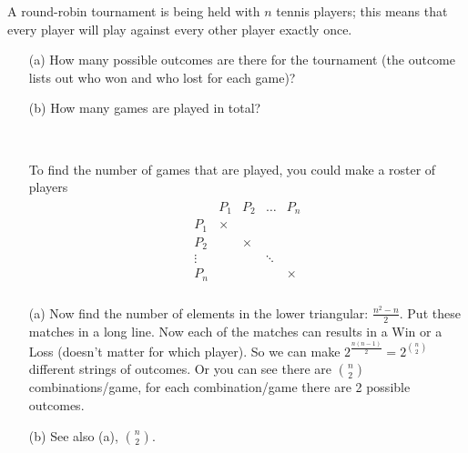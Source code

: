 

\setcounter{theorem}{3}
\begin{exercise}[BH.1.4]
	A round-robin tournament is being held with $n$ tennis players; this means that every player will play against every other player exactly once.
	\begin{enumerate}
		\item[(a)] How many possible outcomes are there for the tournament (the outcome lists out who won and who lost for each game)?
		\item[(b)] How many games are played in total?
	\end{enumerate}
\begin{solution}~
	\begin{enumerate}
		\item[] To find the number of games that are played, you could make a roster of players
		\begin{align*}
			\begin{array}{ccccc}
				&P_{1} & P_{2} &\ldots &P_{n}\\
				P_{1} & \times \\
				P_{2} & & \times \\
				\vdots&&&\ddots\\
				P_{n} & & & &\times\\
				\end{array}
		\end{align*}
		\item[(a)] Now find the number of elements in the lower triangular: $\frac{n^2-n}{2}$. Put these matches in a long line. Now each of the matches can results in a Win or a Loss (doesn't matter for which player). So we can make $2^{\frac{n(n-1)}{2}}=2^{n\choose 2 }$ different strings of outcomes. Or you can see there are $n\choose 2$ combinations/game, for each combination/game there are 2 possible outcomes. 
	\item[(b)] See also (a), $n\choose 2$.
	\end{enumerate}
\end{solution}
\end{exercise}

